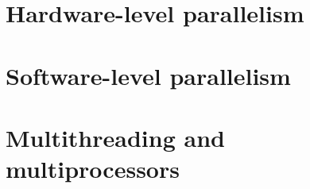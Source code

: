 \documentclass[12pt, a4paper]{report}
\begin{document}
    \chapter{Hardware-level parallelism}
    
        
        
    
    
    
    
    

    \chapter{Software-level parallelism}
    
    
    

    \chapter{Multithreading and multiprocessors}
    
    
    
\end{document}
